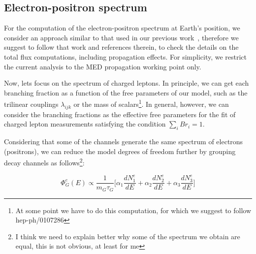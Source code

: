 \documentclass[a4paper,11pt]{article}
\newcommand*{\blue}{\textcolor{blue}}
\begin{document}
\subsection{Electron-positron spectrum}

For the computation of the electron-positron spectrum at Earth's position, we consider an approach similar to that used in our previous work~\cite{Carquin:2015uma}, therefore we suggest to follow that work and references therein, to check the details on the total flux computations, including propagation effects. For simplicity, we restrict the current analysis to the MED propagation working point only.

Now, lets focus on the spectrum of charged leptons. In principle, we can get each branching fraction as a function of the free parameters of our model, such as the trilinear couplings $\lambda_{ijk}$ or the mass of scalars\footnote{At some point we have to do this computation, for which we suggest to follow hep-ph/0107286}. In general, however, we can consider the branching fractions as the effective free parameters for the fit of charged lepton measurements satisfying the condition 
$\sum_{i}Br_{i}=1$. 

Considering that some of the channels generate the same spectrum of electrons (positrons), we can reduce the model degrees of freedom further by grouping decay channels as follows\footnote{I think we need to explain better why some of the spectrum we obtain are equal, this is not obvious, at least for me}:


\begin{equation}
\Phi_{G}^{e}(E) \propto \frac{1}{m_{G}\tau_{G}}\biggl[\alpha_{1}\frac{dN^e_{1}}{dE}+\alpha_{2}\frac{dN^e_{2}}{dE}+\alpha_{3}\frac{dN^e_{3}}{dE}\biggr]
\end{equation}

\end{document}
